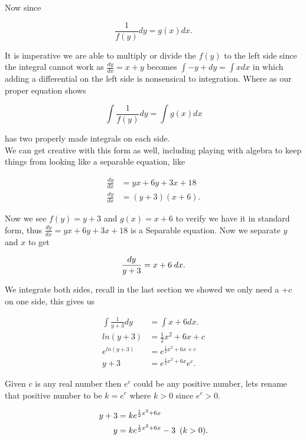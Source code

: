 \documentclass[12pt]{article}
\begin{document}
Now since

\begin{equation*}
    \frac{1}{f(y)} dy = g(x)dx.
\end{equation*}

It is imperative we are able to multiply or divide the $f(y)$ to the left side since the integral cannot work as $\frac{dy}{dx} = x+y$ becomes $\int -y+dy = \int xdx$ in which adding a differential on the left side is nonsensical to integration. Where as our proper equation shows

\begin{equation*}
    \int \frac{1}{f(y)} dy = \int g(x)dx
\end{equation*}

has two properly made integrals on each side. \\

We can get creative with this form as well, including playing with algebra to keep things from looking like a separable equation, like

\begin{align*}
    \frac{dy}{dx} &= yx+6y+3x+18 \\
    \frac{dy}{dx} &= (y+3)(x+6).
\end{align*}

Now we see $f(y)=y+3$ and $g(x)=x+6$ to verify we have it in standard form, thus $\frac{dy}{dx}=yx+6y+3x+18$ is a Separable equation. Now we separate $y$ and $x$ to get

\begin{equation*}
    \frac{dy}{y+3} = x+6 \hspace{2.5 pt} dx.
\end{equation*}

We integrate both sides, recall in the last section we showed we only need a $+c$ on one side, this gives us

\begin{align*}
    \int \frac{1}{y+3} dy &= \int x+6 dx. \\
    ln(y+3) &= \frac{1}{2}x^2+6x+c \\
    e^{ln(y+3)} &= e^{\frac{1}{2}x^2+6x+c} \\
    y+3 &= e^{\frac{1}{2}x^2+6x}e^c.
\end{align*}

Given $c$ is any real number then $e^c$ could be any positive number, lets rename that positive number to be $k=e^c$ where $k>0$ since $e^c>0$.

\begin{align*}
    y+3 &= ke^{\frac{1}{2}x^2+6x} \\
    y &= ke^{\frac{1}{2}x^2+6x}-3 \hspace{5 pt} (k>0).
\end{align*}
\end{document}
